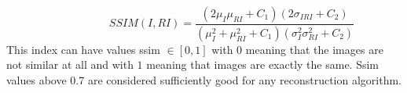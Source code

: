 \begin{equation} \label{eq:ssim2}
\hspace{3em} \hspace{3em} \hspace{3em} SSIM(I,RI)= \frac{(2\mu_{I} \mu_{RI} + C_1)(2\sigma_{IRI}+C_2)}{(\mu_{I}^2 + \mu_{RI}^2 + C_1)(\sigma_{I}^2 \sigma_{RI}^2 + C_2)}   \enspace \enspace \hspace{3em}
\end{equation}
This index can have values ssim $\in [0,1]$ with $0$ meaning that the images are not similar at all and with $1$ meaning that images are exactly the same. Ssim values above 0.7 are considered sufficiently good for any reconstruction algorithm.  

    
 


  
